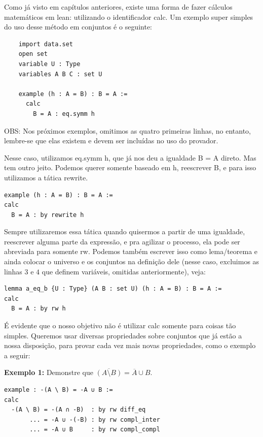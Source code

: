 Como já visto em capítulos anteriores, existe uma forma de fazer cálculos matemáticos em lean: utilizando o identificador {\selectfont calc}. Um exemplo super simples do uso desse método em conjuntos é o seguinte:

\begin{lstlisting}
    import data.set
    open set
    variable U : Type
    variables A B C : set U

    example (h : A = B) : B = A :=
      calc
        B = A : eq.symm h
\end{lstlisting}

OBS: Nos próximos exemplos, omitimos as quatro primeiras linhas, no entanto, lembre-se que elas existem e devem ser incluídas no uso do provador.

Nesse caso, utilizamos {\selectfont eq.symm h}, que já nos deu a igualdade {\selectfont B = A} direto. Mas tem outro jeito. Podemos querer somente baseado em {\selectfont h}, reescrever {\selectfont B}, e para isso utilizamos a tática {\selectfont rewrite}.

\begin{lstlisting}
example (h : A = B) : B = A :=
calc
  B = A : by rewrite h \end{lstlisting}

Sempre utilizaremos essa tática quando quisermos a partir de uma igualdade, reescrever alguma parte da expressão, e pra agilizar o processo, ela pode ser abreviada para somente {\selectfont rw}.
Podemos também escrever isso como lema/teorema e ainda colocar o universo e os conjuntos na definição dele (nesse caso, excluimos as linhas $3$ e $4$ que definem variáveis, omitidas anteriormente), veja:

\begin{lstlisting}
lemma a_eq_b {U : Type} (A B : set U) (h : A = B) : B = A :=
calc
  B = A : by rw h \end{lstlisting}

É evidente que o nosso objetivo não é utilizar {\selectfont calc} somente para coisas tão simples. Queremos usar diversas propriedades sobre conjuntos que já estão a nossa disposição, para provar cada vez mais novas propriedades, como o exemplo a seguir:

\textbf{Exemplo 1:} Demonstre que $\overline{(A \setminus B)} = \overline A \cup B$.
\begin{lstlisting}
example : -(A \ B) = -A ∪ B :=
calc
  -(A \ B) = -(A ∩ -B)  : by rw diff_eq
       ... = -A ∪ -(-B) : by rw compl_inter
       ... = -A ∪ B     : by rw compl_compl \end{lstlisting}


